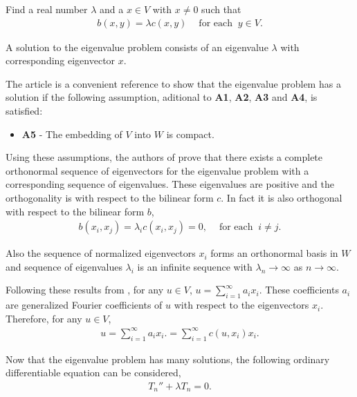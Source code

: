 		Find a real number $\lambda$ and a $x \in V$ with $x \neq 0$ such that
		\begin{eqnarray*}
			b(x,y) = \lambda c(x,y) \ \ \ \ \textrm{ for each } \ y \in V.
		\end{eqnarray*}

		A solution to the eigenvalue problem consists of an eigenvalue $\lambda$ with corresponding eigenvector $x$. 

		The article \cite{CVV18} is a convenient reference to show that the eigenvalue problem has a solution if the following assumption, aditional to \textbf{A1}, \textbf{A2}, \textbf{A3} and \textbf{A4},  is satisfied:

		\begin{itemize}
			\item[] \textbf{A5} - The embedding of $V$ into $W$ is compact.
		\end{itemize}


		Using these assumptions, the authors of \cite{CVV18} prove that there exists a complete orthonormal sequence of eigenvectors for the eigenvalue problem with a corresponding sequence of eigenvalues. These eigenvalues are positive and the orthogonality is with respect to the bilinear form $c$. In fact it is also orthogonal with respect to the bilinear form $b$,
		\begin{eqnarray*}
			b(x_i, x_j) = \lambda_i c(x_i, x_j) = 0, \ \ \ \ \textrm{ for each } \ i \neq j.
		\end{eqnarray*}

		Also the sequence of normalized eigenvectors ${x_i}$ forms an orthonormal basis in $W$ and sequence of eigenvalues ${\lambda_i}$ is an infinite sequence with $\lambda_n \rightarrow \infty$ as $n \rightarrow \infty$. 

		Following these results from \cite{CVV18}, for any $u \in V$, $\displaystyle u = \sum_{i=1}^{\infty} a_i x_i$. These coefficients $a_i$ are generalized Fourier coefficients of $u$ with respect to the eigenvectors $x_i$. Therefore, for any $u \in V$,
		\begin{eqnarray*}
			u = \sum_{i=1}^{\infty} a_i x_i. = \sum_{i=1}^{\infty} c(u, x_i)x_i.
		\end{eqnarray*}

		Now that the eigenvalue problem has many solutions, the following ordinary differentiable equation can be considered,
		\begin{eqnarray*}
			T_n'' + \lambda T_n = 0. 
		\end{eqnarray*}

